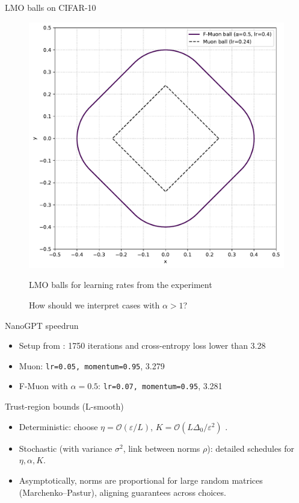 \documentclass[aspectratio=169]{beamer}
\renewcommand{\epsilon}{\varepsilon}
\newcommand{\cO}{\mathcal{O}}
\begin{document}
\begin{frame}{LMO balls on CIFAR-10}
  \begin{figure}[t]
    \includegraphics[height=0.7\textheight]{fstardual_cifar.pdf}
    \centering

    \footnotesize LMO balls for learning rates from the experiment

    \faQuestionCircle \space How should we interpret cases with $\alpha > 1$?
  \end{figure}
\end{frame}
\begin{frame}{NanoGPT speedrun}
    \begin{itemize}
      \item Setup from \citet{modded_nanogpt_2024}: 1750 iterations and cross-entropy loss lower than 3.28
      \item Muon: {\tt lr=0.05, momentum=0.95}, 3.279
      \item F-Muon with \(\alpha=0.5\): {\tt lr=0.07, momentum=0.95}, 3.281
    \end{itemize}
\end{frame}
\begin{frame}{Trust-region bounds (L-smooth)}
  \begin{itemize}
    \item Deterministic: choose \(\eta=\cO(\epsilon/L)\), \(K=\cO(L\Delta_0/\epsilon^2)\) \citep{kovalev2025understanding}.
    \item Stochastic (with variance \(\sigma^2\), link between norms \(\rho\)): detailed schedules for \(\eta,\alpha,K\).
    \item Asymptotically, norms are proportional for large random matrices (Marchenko–Pastur), aligning guarantees across choices.
  \end{itemize}
\end{frame}
\end{document}
